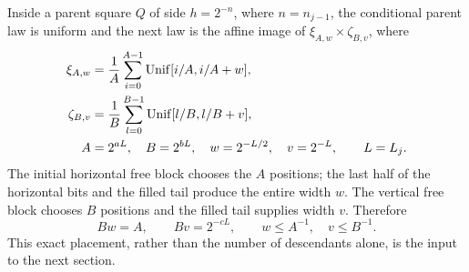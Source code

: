 Inside a parent square $Q$ of side $h=2^{-n}$, where $n=n_{j-1}$,
the conditional parent law is uniform and the next law is the affine image
of $\xi_{A,w}\times\zeta_{B,v}$, where
\begin{align}
 \xi_{A,w}&=\frac1A\sum_{i=0}^{A-1}\operatorname{Unif}[i/A,i/A+w],\nonumber\\
 \zeta_{B,v}&=\frac1B\sum_{l=0}^{B-1}\operatorname{Unif}[l/B,l/B+v],\label{eq:template}\\
 A&=2^{aL},\quad B=2^{bL},\quad w=2^{-L/2},\quad v=2^{-L},
 \qquad L=L_j.\nonumber
\end{align}
The initial horizontal free block chooses the $A$ positions; the last half
of the horizontal bits and the filled tail produce the entire width $w$.
The vertical free block chooses $B$ positions and the filled tail supplies
width $v$. Therefore
\begin{equation}\label{eq:resolution}
 Bw=A,\qquad Bv=2^{-cL},\qquad w\leq A^{-1},\quad v\leq B^{-1}.
\end{equation}
This exact placement, rather than the number of descendants alone, is the
input to the next section.
